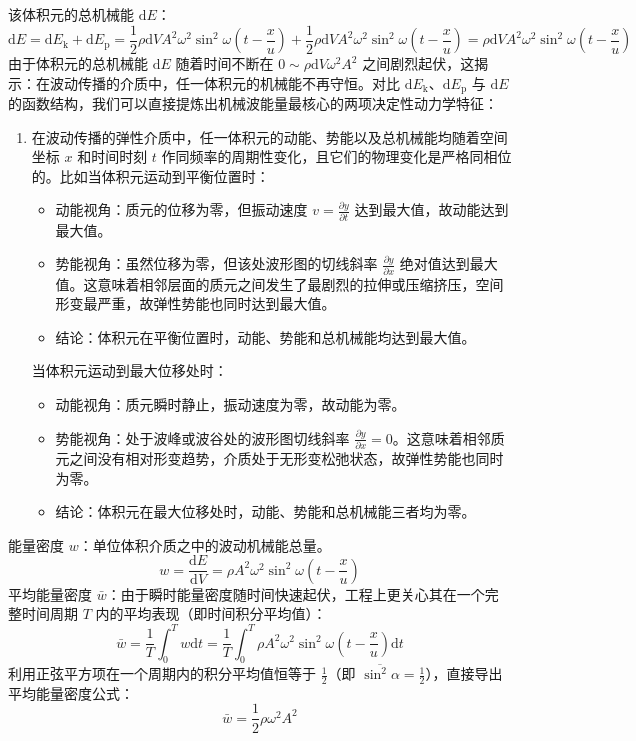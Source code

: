 \documentclass[lang=cn,11pt]{elegantbook}
\begin{document}
该体积元的总机械能 $\mathrm{d}E$：
$$\mathrm{d}E = \mathrm{d}E_{\text{k}} + \mathrm{d}E_{\text{p}} = \frac{1}{2} \rho \mathrm{d}V A^2 \omega^2 \sin^2 \omega \left( t - \frac{x}{u} \right) + \frac{1}{2} \rho \mathrm{d}V A^2 \omega^2 \sin^2 \omega \left( t - \frac{x}{u} \right)= \rho \mathrm{d}V A^2 \omega^2 \sin^2 \omega \left( t - \frac{x}{u} \right)$$
由于体积元的总机械能 $\mathrm{d}E$ 随着时间不断在 $0 \sim \rho \mathrm{d}V \omega^2 A^2$ 之间剧烈起伏，这揭示：在波动传播的介质中，任一体积元的机械能不再守恒。对比 $\mathrm{d}E_{\text{k}}$、\textbf{$\mathrm{d}E_{\text{p}}$} 与 $\mathrm{d}E$ 的函数结构，我们可以直接提炼出机械波能量最核心的两项决定性动力学特征：
\begin{enumerate}
\item 在波动传播的弹性介质中，任一体积元的动能、势能以及总机械能均随着空间坐标 $x$ 和时间时刻 $t$ 作同频率的周期性变化，且它们的物理变化是严格同相位的。比如当体积元运动到平衡位置时：
\begin{itemize}
\item 动能视角：质元的位移为零，但振动速度 $v = \frac{\partial y}{\partial t}$ 达到最大值，故动能达到最大值。
\item 势能视角：虽然位移为零，但该处波形图的切线斜率 $\frac{\partial y}{\partial x}$ 绝对值达到最大值。这意味着相邻层面的质元之间发生了最剧烈的拉伸或压缩挤压，空间形变最严重，故弹性势能也同时达到最大值。
\item 结论：体积元在平衡位置时，动能、势能和总机械能均达到最大值。
\end{itemize}
当体积元运动到最大位移处时：
\begin{itemize}
\item 动能视角：质元瞬时静止，振动速度为零，故动能为零。
\item 势能视角：处于波峰或波谷处的波形图切线斜率 $\frac{\partial y}{\partial x} = 0$。这意味着相邻质元之间没有相对形变趋势，介质处于无形变松弛状态，故弹性势能也同时为零。
\item 结论：体积元在最大位移处时，动能、势能和总机械能三者均为零。
\end{itemize}
\end{enumerate}

\begin{definition}[能量密度与平均能量密度]
能量密度 $w$：单位体积介质之中的波动机械能总量。$$w = \frac{\mathrm{d}E}{\mathrm{d}V} = \rho A^2 \omega^2 \sin^2 \omega \left( t - \frac{x}{u} \right)$$
平均能量密度 $\bar{w}$：由于瞬时能量密度随时间快速起伏，工程上更关心其在一个完整时间周期 $T$ 内的平均表现（即时间积分平均值）：$$\bar{w} = \frac{1}{T} \int_{0}^{T} w \mathrm{d}t = \frac{1}{T} \int_{0}^{T} \rho A^2 \omega^2 \sin^2 \omega \left( t - \frac{x}{u} \right) \mathrm{d}t$$利用正弦平方项在一个周期内的积分平均值恒等于 $\frac{1}{2}$（即 $\overline{\sin^2\alpha} = \frac{1}{2}$），直接导出平均能量密度公式：$$\boxed{\bar{w} = \frac{1}{2} \rho \omega^2 A^2}$$
\end{definition}
\end{document}
